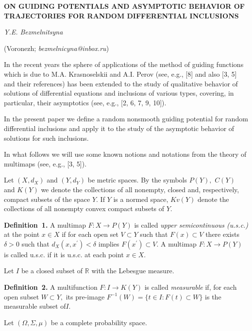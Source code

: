 
\begin{center}
    {\bf ON GUIDING POTENTIALS AND ASYMPTOTIC BEHAVIOR OF TRAJECTORIES FOR RANDOM DIFFERENTIAL INCLUSIONS}

    {\it Y.E. Bezmelnitsyna }

    (Voronezh; {\it bezmelnicyna@inbox.ru})
\end{center}


In the recent years the sphere of applications of the method of guiding functions which is due to M.A. Krasnoselskii and A.I. Perov (see, e.g., [8] and also [3, 5] and their references) has been extended to the study of qualitative behavior of solutions of differential equations and inclusions of various types, covering, in particular, their asymptotics (see, e.g., [2, 6, 7, 9, 10]).

In the present paper we define a random nonsmooth guiding potential for random differential inclusions and apply it to the study of the asymptotic behavior of solutions for such inclusions.

In what follows we will use some known notions and notati\-ons from the theory of multimaps (see, e.g., [3, 5]).

Let $(X,d_X)$ and $(Y,d_Y)$ be metric spaces. By the symbols $P(Y),$ $C(Y)$ and $K(Y)$ we denote the collections of all nonempty, closed and, respectively, compact subsets of the space $Y.$ If $Y$ is a normed space, $Kv(Y)$ denote the collections of all nonempty convex compact subsets of $Y.$

\textbf{Definition~1.}
A multimap $F:X \to P(Y)$ is called {\it upper semicontinuous (u.s.c.)} at the point $x\in X$  if for each open set $V \subset Y$ such that $F(x) \subset V$ there exists $\delta >0$ such that $d_X(x,x^\prime)<\delta$ implies $F(x^\prime)\subset V.$  A multimap $F:X \to P(Y)$ is called u.s.c. if it is u.s.c. at each point $x\in X.$

Let $I$ be a closed subset of $\mathbb{R}$ with the Lebesgue measure.

\textbf{Definition~2.}
A multifunction $F:I \to K(Y)$ is called {\it measurable} if, for each open subset $W \subset Y,$ its pre-image \linebreak
$F^{-1}(W)=\{t\in I:F(t)\subset W\}$ is the measurable subset of$I.$

Let $(\Omega,\Sigma,\mu)$ be a complete probability space.

